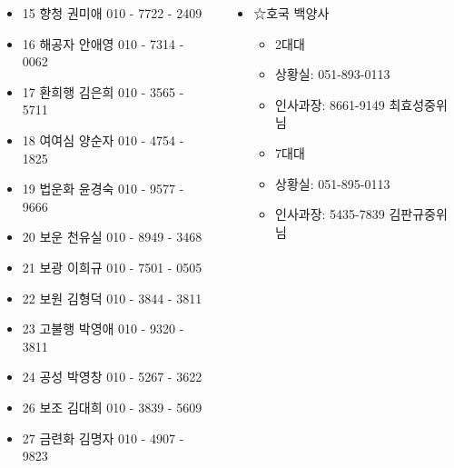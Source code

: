 \documentclass[	25pt, 
							a0paper, 
							portrait, %
							margin=0mm, %
							innermargin=10mm,  		%
							blockverticalspace=4mm, %
							colspace=5mm, 
							subcolspace=0mm
							]{tikzposter}
\begin{document}
\begin{columns}
{\begin{LARGE}
\begin{itemize}
					\item 15	향청	권미애	010 - 7722 - 2409
					\item 16	해공자	안애영	010 - 7314 - 0062
					\item 17	환희행	김은희	010 - 3565 - 5711
					\item 18	여여심	양순자	010 - 4754 - 1825
					\item 19	법운화	윤경숙	010 - 9577 - 9666
					\item 20	보운	천유실	010 - 8949 - 3468
					\item 21	보광	이희규	010 - 7501 - 0505
					\item 22	보원	김형덕	010 - 3844 - 3811
					\item 23	고불행	박영애	010 - 9320 - 3811
					\item 24	공성	박영창	010 - 5267 - 3622
					\item 26	보조	김대희	010 - 3839 - 5609
					\item 27	금련화	김명자	010 - 4907 - 9823
					\end{itemize}
				\end{LARGE}


			}



		{
			\setlength{\leftmargini}{3em}			
			\setlength{\labelsep}{1em} %
			\begin{LARGE}
			\begin{itemize}
			\item ☆호국 백양사
				\begin{itemize}
				\item 2대대 
				\item 상황실: 051-893-0113
				\item 인사과장:  8661-9149 최효성중위님
				\item 7대대  
				\item 상황실: 051-895-0113
				\item 인사과장: 5435-7839 김판규중위님
				\end{itemize}


\end{itemize}
\end{LARGE}}
\end{columns}
\end{document}
